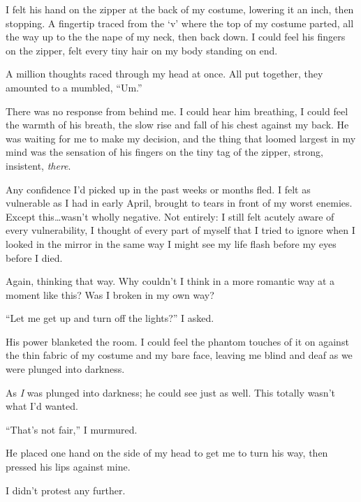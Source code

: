 I felt his hand on the zipper at the back of my costume, lowering it an inch, then stopping.  A fingertip traced from the `v' where the top of my costume parted, all the way up to the the nape of my neck, then back down.  I could feel his fingers on the zipper, felt every tiny hair on my body standing on end.



A million thoughts raced through my head at once.  All put together, they amounted to a mumbled, ``Um.''



There was no response from behind me.  I could hear him breathing, I could feel the warmth of his breath, the slow rise and fall of his chest against my back.  He was waiting for me to make my decision, and the thing that loomed largest in my mind was the sensation of his fingers on the tiny tag of the zipper, strong, insistent, \emph{there}.



Any confidence I'd picked up in the past weeks or months fled.  I felt as vulnerable as I had in early April, brought to tears in front of my worst enemies.  Except this\ldots wasn't wholly negative.  Not entirely: I still felt acutely aware of every vulnerability, I thought of every part of myself that I tried to ignore when I looked in the mirror in the same way I might see my life flash before my eyes before I died.



Again, thinking that way.  Why couldn't I think in a more romantic way at a moment like this?  Was I broken in my own way?



``Let me get up and turn off the lights?'' I asked.



His power blanketed the room.  I could feel the phantom touches of it on against the thin fabric of my costume and my bare face, leaving me blind and deaf as we were plunged into darkness.



As \emph{I }was plunged into darkness; he could see just as well.  This totally wasn't what I'd wanted.



``That's not fair,'' I murmured.



He placed one hand on the side of my head to get me to turn his way, then pressed his lips against mine.



I didn't protest any further.





